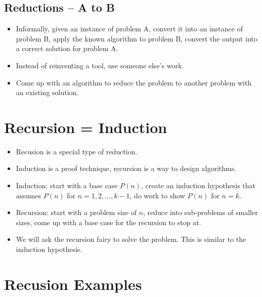 \documentclass[12pt]{article}
\begin{document}
\subsection{Reductions -- A to B}
\begin{itemize}
    \item Informally, given an instance of problem A, convert it into an instance of problem B, apply the known algorithm to problem B, convert the output into a correct solution for problem A.
    \item Instead of reinventing a tool, use someone else's work.
    \item Come up with an algorithm to reduce the problem to another problem with an existing solution.
\end{itemize}

\section{Recursion = Induction}
\begin{itemize}
    \item Recusion is a special type of reduction.
    \item Induction is a proof technique, recursion is a way to design algorithms.
    \item Induction: start with a base case $P(n)$, create an induction hypothesis that assumes $P(n)$ for $n = 1, 2, ..., k-1$, do work to show $P(n)$ for $n = k$.
    \item Recursion: start with a problem size of $n$, reduce into sub-problems of smaller sizes, come up with a base case for the recursion to stop at.
    \item We will ask the recursion fairy to solve the problem. This is similar to the induction hypothesis.
\end{itemize}

\section{Recusion Examples}
\end{document}
